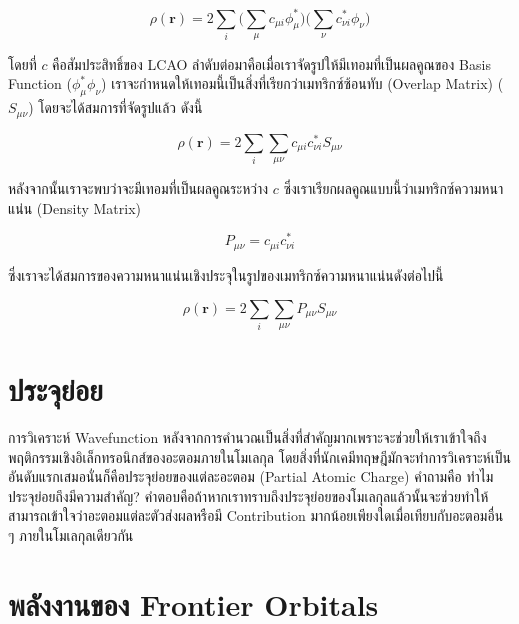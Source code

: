 \begin{equation}
    \rho (\mathbf{r}) = 2 \sum_{i} \big( \sum_{\mu} c_{\mu i} \phi_{\mu}^{*} \big) 
    \big( \sum_{\nu} c^{*}_{\nu i}  \phi_{\nu} \big)
\end{equation}

\noindent โดยที่ $c$ คือสัมประสิทธิ์ของ LCAO ลำดับต่อมาคือเมื่อเราจัดรูปให้มีเทอมที่เป็นผลคูณของ Basis Function ($\phi_{\mu}^{*} 
\phi_{\nu}$) เราจะกำหนดให้เทอมนี้เป็นสิ่งที่เรียกว่าเมทริกซ์ซ้อนทับ (Overlap Matrix) ($S_{\mu\nu}$) โดยจะได้สมการที่จัดรูปแล้ว ดังนี้

\begin{equation}
    \rho (\mathbf{r}) = 2 \sum_{i}\sum_{\mu\nu} c_{\mu i} c^{*}_{\nu i} S_{\mu\nu}
\end{equation}

หลังจากนั้นเราจะพบว่าจะมีเทอมที่เป็นผลคูณระหว่าง $c$ ซึ่งเราเรียกผลคูณแบบนี้ว่าเมทริกซ์ความหนาแน่น (Density Matrix) 

\begin{equation}\label{eq:density_matrix}
    P_{\mu\nu} = c_{\mu i} c^{*}_{\nu i}
\end{equation}

\noindent ซึ่งเราจะได้สมการของความหนาแน่นเชิงประจุในรูปของเมทริกซ์ความหนาแน่นดังต่อไปนี้

\begin{equation}\label{eq:charge_density_matrix}
    \rho (\mathbf{r}) = 2 \sum_{i} \sum_{\mu\nu} P_{\mu\nu}S_{\mu\nu}
\end{equation}

\section{ประจุย่อย}
\label{sec:partial_charge}

การวิเคราะห์ Wavefunction หลังจากการคำนวณเป็นสิ่งที่สำคัญมากเพราะจะช่วยให้เราเข้าใจถึงพฤติกรรมเชิงอิเล็กทรอนิกส์ของอะตอมภายในโมเลกุล 
โดยสิ่งที่นักเคมีทฤษฎีมักจะทำการวิเคราะห์เป็นอันดับแรกเสมอนั่นก็คือประจุย่อยของแต่ละอะตอม (Partial Atomic Charge) คำถามคือ 
ทำไมประจุย่อยถึงมีความสำคัญ? คำตอบคือถ้าหากเราทราบถึงประจุย่อยของโมเลกุลแล้วนั้นจะช่วยทำให้สามารถเข้าใจว่าอะตอมแต่ละตัวส่งผลหรือมี 
Contribution มากน้อยเพียงใดเมื่อเทียบกับอะตอมอื่น ๆ ภายในโมเลกุลเดียวกัน

\section{พลังงานของ Frontier Orbitals}
\label{sec:ener_orb}

